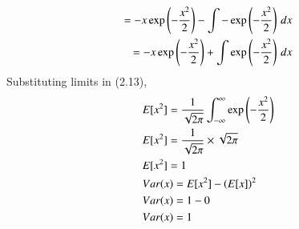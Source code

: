 \documentclass[journal,12pt,twocolumn]{IEEEtran}
\renewcommand\thesection{\arabic{section}}
\begin{document}
\begin{enumerate}[label=\thesection.\arabic*
,ref=\thesection.\theenumi]
\begin{align}
	 = -x\exp\left(-\frac{x^2}{2}\right) - \int -\exp\left(-\frac{x^2}{2}\right) \,dx \\
	 = -x\exp\left(-\frac{x^2}{2}\right) + \int \exp\left(-\frac{x^2}{2}\right) \,dx 
\end{align}
Substituting limits in (2.13),
\begin{align}
	&E[x^2] = \frac{1}{\sqrt{2\pi}} \int_{-\infty}^{\infty} \exp\left(-\frac{x^2}{2}\right) \\
	&E[x^2] = \frac{1}{\sqrt{2\pi}} \times \sqrt{2\pi} \\
	&E[x^2] = 1 \\
	&Var(x) = E[x^2] - \left(E[x]\right)^2 \\
	&Var(x) = 1 - 0 \\
	&Var(x) = 1
\end{align}
\end{enumerate}
\end{document}
